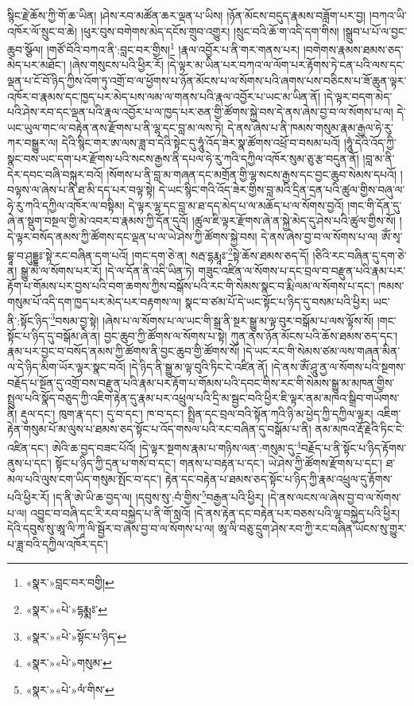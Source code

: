 སྙིང་རྗེ་ཆོས་ཀྱི་གོ་ཆ་ཡིན། །ཤེས་རབ་མཚོན་ཆར་ལྡན་པ་ཡིས། །ཉོན་མོངས་བདུད་རྣམས་བཟློག་པར་བྱ། །བཀའ་ཡི་འཁོར་ལོ་སྲུང་བ་ཆེ། །ཕུར་བུས་བགེགས་མེད་དངོས་གྲུབ་འགྱུར། །སྲུང་བའི་ཆོ་ག་འདི་དག་གིས། །སྒྲུབ་པ་པོ་ལ་བྱང་ཆུབ་སྩོལ། །གཙོ་བོའི་བཀའ་ནི་:བླང་བར་གྱིས།\footnote{«སྣར་»བླང་བར་བགྱི།} །རྣལ་འབྱོར་པ་ནི་གར་གནས་པར། །བགེགས་རྣམས་ཐམས་ཅད་མེད་པར་མཐོང་། །ཞེས་གསུངས་པའི་ཕྱིར་རོ། །དེ་ལྟར་མ་ཡིན་པར་བཀའ་ལ་ལོག་པར་རྟོགས་ཏེ་ངན་པའི་ལས་དང་ལྡན་པ་ངོ་བོ་ཉིད་ཀྱིས་འོག་ཏུ་འགྲོ་བ་ལ་ཕྱོགས་པ་ཉོན་མོངས་པ་ལ་སོགས་པའི་ཞགས་པས་བཅིངས་པ་ཟོ་ཆུན་ལྟར་འཁོར་བ་རྣམས་དང་ཁྱད་པར་མེད་པས་ལམ་ལ་གནས་པའི་རྣལ་འབྱོར་པ་ཡང་མ་ཡིན་ནོ། །དེ་ལྟར་བདག་མེད་པའི་ཤེས་རབ་དང་ལྡན་པའི་རྣལ་འབྱོར་པ་ལ་ཁྱད་པར་ཅན་གྱི་ཚོགས་སྐྱེ་བས་དེ་ནས་ཞེས་བྱ་བ་ལ་སོགས་པ་ལ། དེ་ཡང་ཡུལ་གང་ལ་བརྟེན་ནས་རྫོགས་པ་ནི་ལྷ་དང་བླ་མ་ལས་ཏེ། དེ་ནས་ཞེས་པ་ནི་ཁམས་གསུམ་རྣམ་རྒྱལ་ཧེ་རུ་ཀར་བསྒྱུར་ལ། དེའི་སྙིང་གར་ཨ་ལས་ཟླ་བ་དེའི་སྟེང་དུ་ཧཱུཾ་འོད་ཟེར་སྣ་ཚོགས་འཕྲོ་བ་བསམ་པའོ། །ཧཱུཾ་དེའི་འོད་ཀྱི་སྣང་བས་ཡང་དག་པར་རྫོགས་པའི་སངས་རྒྱས་ནི་དཔལ་ཧེ་རུ་ཀའི་དཀྱིལ་འཁོར་སུམ་ཅུ་རྩ་བདུན་ནོ། །བླ་མ་ནི་དེར་དབང་བཞི་བསྐུར་བའོ། །སོགས་པ་ནི་བླ་མ་གཞན་དང་མགྲོན་གྱི་ལྷ་སངས་རྒྱས་དང་བྱང་ཆུབ་སེམས་དཔའོ། །བལྟས་ལ་ཞེས་པ་ནི་ཐ་མི་དད་པར་བལྟ་སྟེ། དེ་ཡང་སྙིང་གའི་འོད་ཟེར་གྱིས་བླ་མའི་དྲིན་དྲན་པའི་ཚུལ་གྱིས་བཞུ་ལ་ཧེ་རུ་ཀའི་དཀྱིལ་འཁོར་ལ་བསྟིམ། དེ་ལྟར་ལྷ་དང་བླ་མ་ཐ་དད་མེད་པ་ལ་མཆོད་པ་ལ་སོགས་བྱའོ། །གང་གི་དོན་དུ་ཞེ་ན་སྡུག་བསྔལ་གྱི་མེ་འབར་བ་རྣམས་ཀྱི་དོན་དུའོ། །ཚུལ་ཇི་ལྟར་རྫོགས་ཞེ་ན་སྐྱེ་མེད་དུ་ཤེས་པའི་ཚུལ་གྱིས་སོ། །དེ་ལྟར་བསོད་ནམས་ཀྱི་ཚོགས་དང་ལྡན་པ་ལ་ཡེ་ཤེས་ཀྱི་ཚོགས་སྐྱེ་བས། དེ་ནས་ཞེས་བྱ་བ་ལ་སོགས་པ་ལ། ཨོཾ་སྭ་བྷཱ་བ་ཤུདྡྷཿ་སྟེ་རང་བཞིན་དག་པའོ། །གང་དག་ཅེ་ན། སརྦ་དྷརྨཱཿ་\footnote{«སྣར་»«པེ་»དྷརྨྨཿ་}སྟེ་ཆོས་ཐམས་ཅད་དོ། །ཅིའི་རང་བཞིན་དུ་དག་ཅེ་ན། སྒྱུ་མ་ལ་སོགས་པར་རོ། །དེ་ལ་དོན་ནི་འདི་ཡིན་ཏེ། གཟུང་འཛིན་ལ་སོགས་པ་དང་བྲལ་བ་བརྫུན་པའི་རྣམ་པར་རྟོག་པ་གོམས་པར་བྱས་པའི་བག་ཆགས་ཀྱིས་བསྒོས་པའི་རང་གི་སེམས་སྣང་བ་རྨི་ལམ་ལ་སོགས་པ་དང་། ཁམས་གསུམ་པོ་འདི་དག་ཁྱད་པར་མེད་པར་བརྟགས་ལ། སྣང་བ་ཙམ་པོ་དེ་ཡང་སྟོང་པ་ཉིད་དུ་བསམ་པའི་ཕྱིར། ཡང་ནི་:སྟོང་ཉིད་\footnote{«སྣར་»«པེ་»སྟོང་པ་ཉིད་}བསམ་བྱ་སྟེ། །ཞེས་པ་ལ་སོགས་པ་ལ་ཡང་གི་སྒྲ་ནི་སྔར་སྒྱུ་མ་ལྟ་བུར་བསྒོམ་པ་ལས་ལྟོས་སོ། །གང་སྟོང་པ་ཉིད་དུ་བསྒོམ་ཞེ་ན། བྱང་ཆུབ་ཀྱི་ཚོགས་ལ་སོགས་པ་སྟེ། ཀུན་ནས་ཉོན་མོངས་པའི་ཆོས་ཐམས་ཅད་དང་། རྣམ་པར་བྱང་བ་བསོད་ནམས་ཀྱི་ཚོགས་ནི་བྱང་ཆུབ་གྱི་ཚོགས་སོ། །དེ་ཡང་རང་གི་སེམས་ཙམ་ལས་གཞན་མིན་ལ་དེ་ཉིད་མིག་ཡོར་ལྟར་སྣང་བའོ། །དེ་ཉིད་ནི་སྒྱུ་མ་ལྟ་བུའི་ཏིང་ངེ་འཛིན་ནོ། །དེ་ནས་ཨོཾ་ཤཱུ་ནྱ་ལ་སོགས་པའི་སྔགས་བརྗོད་པ་སྔོན་དུ་འགྲོ་བས་བརྫུན་པའི་རྣམ་པར་རྟོག་པ་གོམས་པའི་དབང་གིས་རང་གི་སེམས་སྒྱུ་མ་མཁན་གྱིས་སྤྲུལ་པའི་སྣོད་བཅུད་ཀྱི་འཇིག་རྟེན་དུ་རྣམ་པར་འཕྲུལ་པའི་དྲི་མ་སྦྱང་བའི་ཕྱིར་ཇི་ལྟར་ནམ་མཁའ་སྒྲིབ་གཡོགས་ནི། རྡུལ་དང་། ཁུག་རྣ་དང་། དུ་བ་དང་། ཁ་བ་དང་། སྤྲིན་དང་བྲལ་བའི་སྟོན་ཀའི་ཉི་མ་ཕྱེད་ཀྱི་དཀྱིལ་ལྟར། འཇིག་རྟེན་གསུམ་པོ་མ་ལུས་པ་ཐམས་ཅད་སྟོང་པ་འོད་གསལ་པའི་རང་བཞིན་དུ་བསྒོམ་པ་ནི། ནམ་མཁའ་རྡོ་རྗེའི་ཏིང་ངེ་འཛིན་དང་། ཨེའི་ཆ་བྱད་བཟང་པོའོ། །དེ་ལྟར་སྔགས་རྣམ་པ་གཉིས་ལན་:གསུམ་དུ་\footnote{«སྣར་»«པེ་»གསུམ་}བརྗོད་པ་ནི་སྟོང་པ་ཉིད་རྟོགས་ནུས་པ་དང་། སྟོང་པ་ཉིད་ཀྱི་དྲན་པ་གསོ་བ་དང་། གནས་པ་བརྟན་པ་དང་། ཡེ་ཤེས་ཀྱི་ཚོགས་རྫོགས་པ་དང་། ཐ་མལ་པའི་ལུས་ངག་ཡིད་གསུམ་སྤོང་བ་དང་། རྟེན་དང་བརྟེན་པ་ཐམས་ཅད་སྟོང་པ་ཉིད་ཀྱི་རྣམ་འཕྲུལ་དུ་རྟོགས་པའི་ཕྱིར་རོ། །ད་ནི་ཨེ་ཡི་ཆ་བྱད་ལ། །དབུས་སུ་:བཾ་གྱིས་\footnote{«སྣར་»«པེ་»ལཾ་གིས་}བརྒྱན་པའི་ཕྱིར། །དེ་ནས་ལངས་ལ་ཞེས་བྱ་བ་ལ་སོགས་པ་ལ། འབྱུང་བ་བཞི་དང་རི་རབ་བསྐྱེད་པ་ནི་གོ་སླའོ། །དེ་ནས་རྟེན་དང་བརྟེན་པར་བཅས་པའི་ལྷ་བསྐྱེད་པའི་ཕྱིར། དེའི་དབུས་སུ་ཨཱ་ལི་ཀཱ་ལི་སྦྱོར་བ་ཞེས་བྱ་བ་ལ་སོགས་པ་ལ། ཨཱ་ལི་བཅུ་དྲུག་ཤེས་རབ་ཀྱི་རང་བཞིན་ཡོངས་སུ་གྱུར་པ་ཟླ་བའི་དཀྱིལ་འཁོར་དང་། 